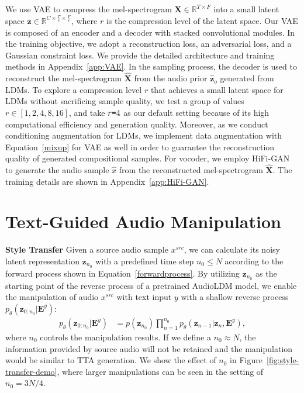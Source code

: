 \documentclass{article}
\begin{document}
We use VAE to compress the mel-spectrogram $\boldsymbol{X}\in \mathbb{R}^{T\times F}$ into a small latent space $\boldsymbol{z}\in \mathbb{R}^{C\times \frac{T}{r}\times \frac{F}{r}}$, where $r$ is the compression level of the latent space. Our VAE is composed of an encoder and a decoder with stacked convolutional modules. In the training objective, we adopt a reconstruction loss, an adversarial loss, and a Gaussian constraint loss. We provide the detailed architecture and training methods in Appendix~\ref{app:VAE}. In the sampling process, the decoder is used to reconstruct the mel-spectrogram $\boldsymbol{\hat{X}}$ from the audio prior $\boldsymbol{\hat{z}}_{o}$ generated from LDMs. To explore a compression level $r$ that achieves a small latent space for LDMs without sacrificing sample quality, we test a group of values $r\in \left[1,2, 4,8,16\right]$, and take $r\texttt{=}4$ as our default setting because of its high computational efficiency and generation quality. Moreover, as we conduct conditioning augmentation for LDMs, we implement data augmentation with Equation~\ref{mixup} for VAE as well in order to guarantee the reconstruction quality of generated compositional samples. For vocoder, we employ HiFi-GAN~\cite{kong2020hifi} to generate the audio sample $\hat{x}$ from the reconstructed mel-spectrogram $\boldsymbol{\hat{X}}$. The training details are shown in Appendix~\ref{app:HiFi-GAN}.




\section{Text-Guided Audio Manipulation}
\label{AudioLDM}



\textbf{Style Transfer}
\label{AST}
Given a source audio sample $x^{src}$, we can calculate its noisy latent representation $\boldsymbol{z}_{n_{0}}$ with a predefined time step $n_{0}\leq N$ according to the forward process shown in Equation~\ref{forwardprocess}. By utilizing $\boldsymbol{z}_{n_{0}}$ as the starting point of the reverse process of a pretrained AudioLDM model, we enable the manipulation of audio $x^{src}$ with text input $y$ with a shallow reverse process $p_{\theta}(\boldsymbol{z}_{0:n_{0}}|\boldsymbol{E}^{y})$:
\begin{align}
\label{shallowreverse}
p_{\theta}(\boldsymbol{z}_{0:n_{0}}|\boldsymbol{E}^{y})&=p(\boldsymbol{z}_{n_{0}})\prod_{n=1}^{n_{0}}p_{\theta}(\boldsymbol{z}_{n-1}|\boldsymbol{z}_{n},\boldsymbol{E}^{y}),
\end{align}
where $n_{0}$ controls the manipulation results. If we define a $n_{0}\approx N$, the information provided by source audio will not be retained and the manipulation would be similar to TTA generation. We show the effect of $n_{0}$ in Figure~\ref{fig:style-transfer-demo}, where larger manipulations can be seen in the setting of $n_{0}=3N/4$.
\end{document}
